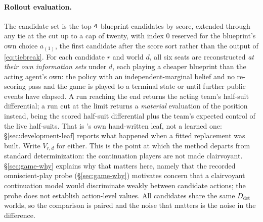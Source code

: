 \paragraph{Rollout evaluation.} The candidate set is the top $\texttt{4{}}$ blueprint
candidates by score, extended through any tie at the cut up to a cap of twenty, with index $0$
reserved for the blueprint's own choice $a_{(1)}$, the first candidate after the score sort rather
than the output of \eqref{eq:tiebreak}. For each candidate $r$ and world $d$, all six seats are reconstructed \emph{at their own information
sets} under $d$, each playing a cheaper blueprint than the acting agent's own: the \vfive{} policy
with an independent-marginal belief and no re-scoring pass and the game is played to a terminal state or until \texttt{\vsevenOptDepth{}} further public events
have elapsed. A run reaching the end returns the acting team's half-suit differential; a run cut at the limit
returns a \emph{material} evaluation of the position instead, being the scored half-suit differential
plus the team's expected control of the live half-suits. That is \vsix{}'s own hand-written leaf, not
a learned one: \S\ref{sec:development-leaf} reports what happened when a fitted replacement was
built. Write $V_{r,d}$ for either. This is the point at which the method departs from standard
determinization: the continuation players are not made clairvoyant. \S\ref{sec:game-why} explains why
that matters here, namely that the recorded omniscient-play probe (\S\ref{sec:game-why})
motivates concern that a clairvoyant continuation model would discriminate weakly between candidate
actions; the probe does not establish action-level values. All candidates share the same $D_{\mathrm{det}}$ worlds, so the comparison is paired and the
noise that matters is the noise in the difference.

